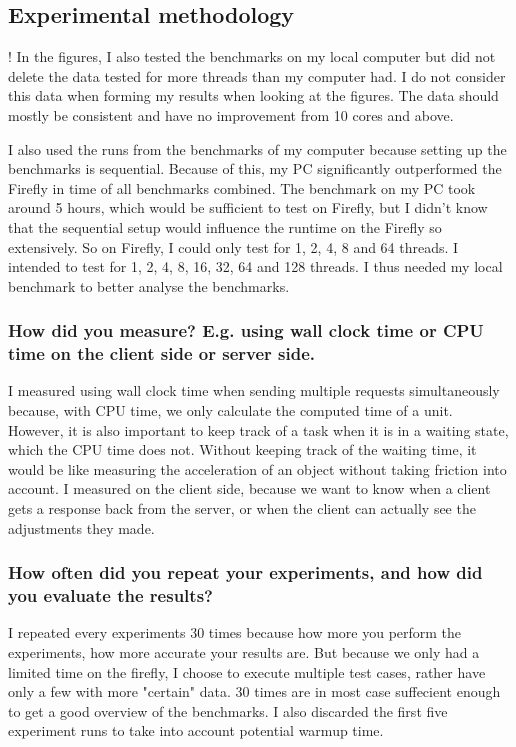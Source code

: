 \documentclass[a4paper]{article}
\begin{document}
\subsection{Experimental methodology}
! In the figures, 
I also tested the benchmarks on my local computer but did not delete the data tested for more threads than my computer had. I do not consider this data when forming my results when looking at the figures. The data should mostly be consistent and have no improvement from 10 cores and above.

I also used the runs from the benchmarks of my computer because setting up the benchmarks is sequential. Because of this, my PC significantly outperformed the Firefly in time of all benchmarks combined. The benchmark on my PC took around 5 hours, which would be sufficient to test on Firefly, but I didn't know that the sequential setup would influence the runtime on the Firefly so extensively. So on Firefly, I could only test for 1, 2, 4, 8 and 64 threads. I intended to test for 1, 2, 4, 8, 16, 32, 64 and 128 threads. I thus needed my local benchmark to better analyse the benchmarks.   

\subsubsection{How did you measure? E.g. using wall clock time or CPU time on the client side or server side.}
I measured using wall clock time when sending multiple requests simultaneously because, with CPU time, we only calculate the computed time of a unit. However, it is also important to keep track of a task when it is in a waiting state, which the CPU time does not.
Without keeping track of the waiting time, it would be like measuring the acceleration of an object without taking friction into account.
I measured on the client side, because we want to know when a client gets a response back from the server, or when the client can actually see the adjustments they made.
\subsubsection{How often did you repeat your experiments, and how did you evaluate the results?}
I repeated every experiments 30 times because how more you perform the experiments, how more accurate your results are. But because we only had a limited time on the firefly, I choose to execute multiple test cases, rather have only a few with more "certain" data. 30 times are in most case suffecient enough to get a good overview of the benchmarks.
I also discarded the first five experiment runs to take into account potential warmup time.
\end{document}
